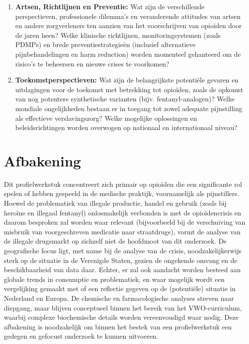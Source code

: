 \documentclass[11pt, a4paper]{report} %
\begin{document}
\begin{enumerate}
    \item \textbf{Artsen, Richtlijnen en Preventie:} Wat zijn de verschillende perspectieven, professionele dilemma's en veranderende attitudes van artsen en andere zorgverleners ten aanzien van het voorschrijven van opioïden door de jaren heen? Welke klinische richtlijnen, monitoringsystemen (zoals PDMPs) en brede preventiestrategieën (inclusief alternatieve pijnbehandelingen en harm reduction) worden momenteel gehanteerd om de risico's te beheersen en nieuwe crises te voorkomen?
    \item \textbf{Toekomstperspectieven:} Wat zijn de belangrijkste potentiële gevaren en uitdagingen voor de toekomst met betrekking tot opioïden, zoals de opkomst van nog potentere synthetische varianten (bijv. fentanyl-analogen)? Welke mondiale ongelijkheden bestaan er in toegang tot zowel adequate pijnstilling als effectieve verslavingszorg? Welke mogelijke oplossingen en beleidsrichtingen worden overwogen op nationaal en internationaal niveau?
\end{enumerate}

\section{Afbakening}
Dit profielwerkstuk concentreert zich primair op opioïden die een significante rol spelen of hebben gespeeld in de medische praktijk, voornamelijk als pijnstillers. Hoewel de problematiek van illegale productie, handel en gebruik (zoals bij heroïne en illegaal fentanyl) onlosmakelijk verbonden is met de opioïdencrisis en daarom besproken zal worden waar relevant (bijvoorbeeld bij de verschuiving van misbruik van voorgeschreven medicatie naar straatdrugs), vormt de analyse van de illegale drugsmarkt op zichzelf niet de hoofdmoot van dit onderzoek. De geografische focus ligt, met name bij de analyse van de crisis, noodzakelijkerwijs sterk op de situatie in de Verenigde Staten, gezien de ongekende omvang en de beschikbaarheid van data daar. Echter, er zal ook aandacht worden besteed aan globale trends in consumptie en problematiek, en waar mogelijk wordt een vergelijking gemaakt met of een reflectie gegeven op de (potentiële) situatie in Nederland en Europa. De chemische en farmacologische analyses streven naar diepgang, maar blijven conceptueel binnen het bereik van het VWO-curriculum, waarbij complexe biochemische details worden vereenvoudigd waar nodig. Deze afbakening is noodzakelijk om binnen het bestek van een profielwerkstuk een gedegen en gefocust onderzoek te kunnen uitvoeren.
\end{document}
